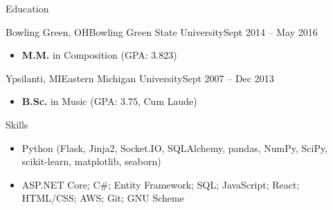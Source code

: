 \documentclass[calibri]{mcdowellcv}
\begin{document}
	\begin{cvsection}{Education}
		\begin{cvsubsection}{Bowling Green, OH}{Bowling Green State University}{Sept 2014 -- May 2016}
			\begin{itemize}
				\item \textbf{M.M.} in Composition (GPA: 3.823)
			\end{itemize}
		\end{cvsubsection}
		\begin{cvsubsection}{Ypsilanti, MI}{Eastern Michigan University}{Sept 2007 -- Dec 2013}
			\begin{itemize}
				\item \textbf{B.Sc.} in Music (GPA: 3.75, Cum Laude)
			\end{itemize}
		\end{cvsubsection}
	\end{cvsection}
	
	\begin{cvsection}{Skills}
		\begin{cvsubsection}{}{}{}	
			\begin{itemize}
				\item Python (Flask, Jinja2, Socket.IO, SQLAlchemy, pandas, NumPy, SciPy, scikit-learn, matplotlib, seaborn)
				\item ASP.NET Core; C\#; Entity Framework; SQL; JavaScript; React; HTML/CSS; AWS; Git; GNU Scheme
			\end{itemize}
		\end{cvsubsection}
	\end{cvsection}
	
\end{document}
